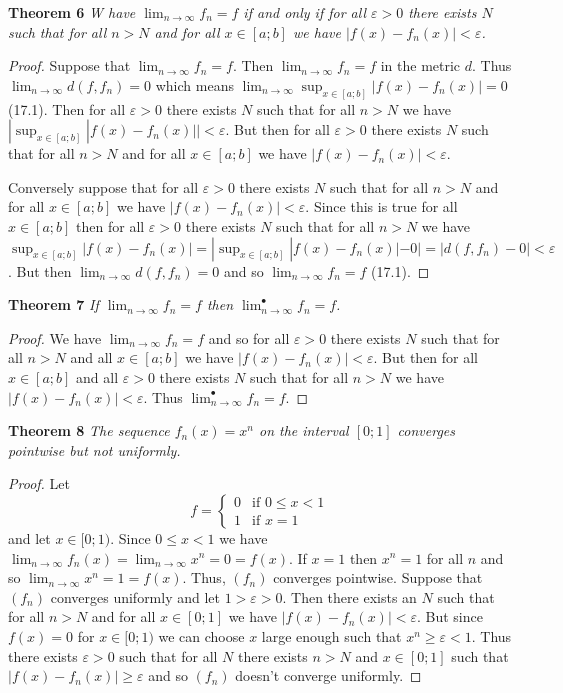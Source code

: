 \documentclass{article}
\begin{document}
\begin{flushleft}
\textbf{Theorem 6}
\textsl{W have $\lim_{n \rightarrow \infty} f_n = f$ if and only if for all $\varepsilon > 0$ there exists $N$ such that for all $n > N$ and for all $x \in [a;b]$ we have $|f(x) - f_n(x)| < \varepsilon$.}
\begin{proof}
Suppose that $\lim_{n \rightarrow \infty} f_n = f$. Then $\lim_{n \rightarrow \infty} f_n = f$ in the metric $d$. Thus $\lim_{n \rightarrow \infty} d(f,f_n) = 0$ which means $\lim_{n \rightarrow \infty} \sup_{x \in [a;b]} |f(x)-f_n(x)| = 0$ (17.1). Then for all $\varepsilon > 0$ there exists $N$ such that for all $n>N$ we have $|\sup_{x \in [a;b]} |f(x)-f_n(x)|| < \varepsilon$. But then for all $\varepsilon > 0$ there exists $N$ such that for all $n>N$ and for all $x \in [a;b]$ we have $|f(x) - f_n(x)| < \varepsilon$.\newline

Conversely suppose that for all $\varepsilon > 0$ there exists $N$ such that for all $n > N$ and for all $x \in [a;b]$ we have $|f(x) - f_n(x)| < \varepsilon$. Since this is true for all $x \in [a;b]$ then for all $\varepsilon > 0$ there exists $N$ such that for all $n>N$ we have $\sup_{x \in [a;b]} |f(x)-f_n(x)| = |\sup_{x \in [a;b]} |f(x)-f_n(x)| - 0| = |d(f,f_n) - 0| < \varepsilon$. But then $\lim_{n \rightarrow \infty} d(f,f_n) = 0$ and so $\lim_{n \rightarrow \infty} f_n = f$ (17.1).
\end{proof}

\textbf{Theorem 7}
\textsl{If $\lim_{n \rightarrow \infty} f_n = f$ then $\lim_{n \rightarrow \infty}^{\bullet} f_n = f$.}
\begin{proof}
We have $\lim_{n \rightarrow \infty} f_n = f$ and so for all $\varepsilon > 0$ there exists $N$ such that for all $n>N$ and all $x \in [a;b]$ we have $|f(x)-f_n(x)| < \varepsilon$. But then for all $x \in [a;b]$ and all $\varepsilon > 0$ there exists $N$ such that for all $n>N$ we have $|f(x)-f_n(x)| < \varepsilon$. Thus $\lim_{n \rightarrow \infty}^{\bullet} f_n = f$.
\end{proof}

\textbf{Theorem 8}
\textsl{The sequence $f_n(x) = x^n$ on the interval $[0;1]$ converges pointwise but not uniformly.}
\begin{proof}
Let
\[
f=
\begin{cases}
0 & \text{if $0 \leq x < 1$}\\
1 & \text{if $x=1$}
\end{cases}
\]
and let $x \in [0;1)$. Since $0 \leq x < 1$ we have $\lim_{n \rightarrow \infty} f_n(x) = \lim_{n \rightarrow \infty} x^n = 0 = f(x)$. If $x=1$ then $x^n = 1$ for all $n$ and so $\lim_{n \rightarrow \infty} x^n = 1 = f(x)$. Thus, $(f_n)$ converges pointwise. Suppose that $(f_n)$ converges uniformly and let $1 > \varepsilon > 0$. Then there exists an $N$ such that for all $n>N$ and for all $x \in [0;1]$ we have $|f(x)-f_n(x)| < \varepsilon$. But since $f(x) = 0$ for $x \in [0;1)$ we can choose $x$ large enough such that $x^n \geq \varepsilon < 1$. Thus there exists $\varepsilon > 0$ such that for all $N$ there exists $n>N$ and $x \in [0;1]$ such that $|f(x) - f_n(x)| \geq \varepsilon$ and so $(f_n)$ doesn't converge uniformly.
\end{proof}


\end{flushleft}
\end{document}
